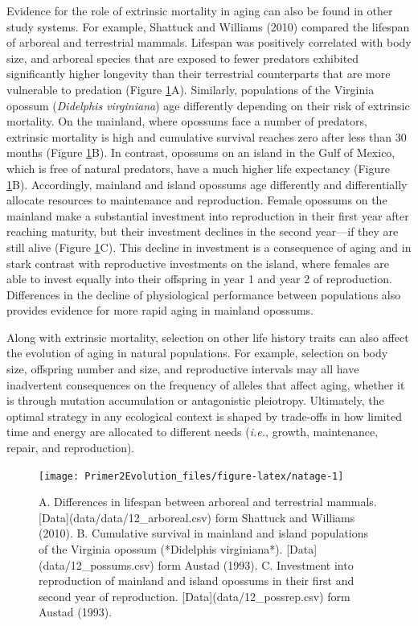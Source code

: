 \documentclass[
]{book}
\begin{document}
Evidence for the role of extrinsic mortality in aging can also be found in other study systems. For example, Shattuck and Williams (2010) compared the lifespan of arboreal and terrestrial mammals. Lifespan was positively correlated with body size, and arboreal species that are exposed to fewer predators exhibited significantly higher longevity than their terrestrial counterparts that are more vulnerable to predation (Figure \ref{fig:natage}A). Similarly, populations of the Virginia opossum (\emph{Didelphis virginiana}) age differently depending on their risk of extrinsic mortality. On the mainland, where opossums face a number of predators, extrinsic mortality is high and cumulative survival reaches zero after less than 30 months (Figure \ref{fig:natage}B). In contrast, opossums on an island in the Gulf of Mexico, which is free of natural predators, have a much higher life expectancy (Figure \ref{fig:natage}B). Accordingly, mainland and island opossums age differently and differentially allocate resources to maintenance and reproduction. Female opossums on the mainland make a substantial investment into reproduction in their first year after reaching maturity, but their investment declines in the second year---if they are still alive (Figure \ref{fig:natage}C). This decline in investment is a consequence of aging and in stark contrast with reproductive investments on the island, where females are able to invest equally into their offspring in year 1 and year 2 of reproduction. Differences in the decline of physiological performance between populations also provides evidence for more rapid aging in mainland opossums.

Along with extrinsic mortality, selection on other life history traits can also affect the evolution of aging in natural populations. For example, selection on body size, offspring number and size, and reproductive intervals may all have inadvertent consequences on the frequency of alleles that affect aging, whether it is through mutation accumulation or antagonistic pleiotropy. Ultimately, the optimal strategy in any ecological context is shaped by trade-offs in how limited time and energy are allocated to different needs (\emph{i.e.}, growth, maintenance, repair, and reproduction).

\begin{figure}
\texttt{[image: Primer2Evolution\_files/figure-latex/natage-1]} \caption{A. Differences in lifespan between arboreal and terrestrial mammals. [Data](data/data/12_arboreal.csv) form Shattuck and Williams (2010). B. Cumulative survival in mainland and island populations of the Virginia opossum (*Didelphis virginiana*). [Data](data/12_possums.csv) form Austad (1993). C. Investment into reproduction of mainland and island opossums in their first and second year of reproduction. [Data](data/12_possrep.csv) form Austad (1993).}\label{fig:natage}
\end{figure}
\end{document}
